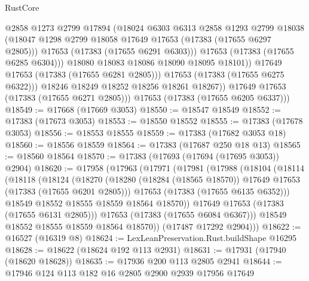 \begin{lexlean}{RustCore}
\begin{coremodule}
                      @2858
                      @1273
                      @2799
                      @17894
                      (@18024
                        @6303
                        @6313
                        @2858
                        @1293
                        @2799
                        @18038
                        (@18047 @1298 @2799 @18058 @17649 @17653 (@17383 (@17655 @6297 @2805)))
                        @17653
                        (@17383 (@17655 @6291 @6303)))
                      @17653
                      (@17383 (@17655 @6285 @6304)))
                    @18080
                    @18083
                    @18086
                    @18090
                    @18095
                    @18101))
                @17649
                @17653
                (@17383 (@17655 @6281 @2805)))
              @17653
              (@17383 (@17655 @6275 @6322)))
            @18246
            @18249
            @18252
            @18256
            @18261
            @18267))
        @17649
        @17653
        (@17383 (@17655 @6271 @2805)))
      @17653
      (@17383 (@17655 @6205 @6337)))
@18549 := @17668 (@17669 @3053)
@18550 := @18547 @18549
@18552 := @17383 (@17673 @3053)
@18553 := @18550 @18552
@18555 := @17383 (@17678 @3053)
@18556 := @18553 @18555
@18559 := @17383 (@17682 @3053 @18)
@18560 := @18556 @18559
@18564 := @17383 (@17687 @250 @18 @13)
@18565 := @18560 @18564
@18570 := @17383 (@17693 (@17694 (@17695 @3053)) @2904)
@18620 := @17958
    (@17963
      (@17971
        (@17981
          (@17988
            (@18104
              (@18114
                (@18118
                  (@18124
                    (@18270
                      (@18280 (@18284 (@18565 @18570)) @17649 @17653 (@17383 (@17655 @6201 @2805)))
                      @17653
                      (@17383 (@17655 @6135 @6352)))
                    @18549
                    @18552
                    @18555
                    @18559
                    @18564
                    @18570))
                @17649
                @17653
                (@17383 (@17655 @6131 @2805)))
              @17653
              (@17383 (@17655 @6084 @6367)))
            @18549
            @18552
            @18555
            @18559
            @18564
            @18570))
        (@17487 @17292 @2904)))
@18622 := @16527 (@16319 @8)
@18624 := LexLeanPreservation.Rust.buildShape @16295
@18628 := @18622 (@18624 @192 @113 @2931)
@18631 := @17931 (@17940 (@18620 @18628))
@18635 := @17936 @200 @113 @2805 @2941
@18644 := @17946 @124 @113 @182 @16 @2805 @2900 @2939 @17956 @17649

\end{coremodule}
\end{lexlean}
